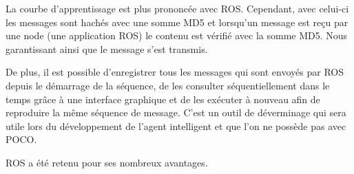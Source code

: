 La courbe d’apprentissage est plus prononcée avec ROS. Cependant, avec celui-ci les messages sont hachés avec une somme MD5 et lorsqu’un message est reçu par une node (une application ROS) le contenu est vérifié avec la somme MD5. Nous garantissant ainsi que le message s’est transmis.

De plus, il est possible d’enregistrer tous les messages qui sont envoyés par ROS depuis le démarrage de la séquence, de les consulter séquentiellement dans le temps grâce à une interface graphique et de les exécuter à nouveau afin de reproduire la même séquence de message. C’est un outil de déverminage qui sera utile lors du développement de l’agent intelligent et que l’on ne possède pas avec POCO.

ROS a été retenu pour ses nombreux avantages. 
